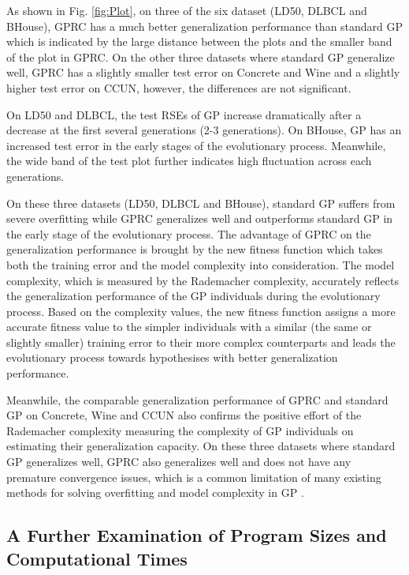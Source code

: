 \documentclass[conference]{IEEEtran}
\begin{document}
As shown in Fig. \ref{fig:Plot}, on three of the six dataset (LD50, DLBCL and BHouse), GPRC has a much better generalization performance than standard GP which is indicated by the large distance between the plots and the smaller band of the plot in GPRC. On the other three datasets where standard GP generalize well, GPRC has a slightly smaller test error on Concrete and Wine and a slightly higher test error on CCUN, however, the differences are not significant.

On LD50 and DLBCL, the test RSEs of GP increase dramatically after a decrease at the first several generations (2-3 generations). On BHouse, GP has an increased test error in the early stages of the evolutionary process. Meanwhile, the wide band of the test plot further indicates high fluctuation across each generations. 

On these three datasets (LD50, DLBCL and BHouse), standard GP suffers from severe overfitting while GPRC generalizes well and outperforms standard GP in the early stage of the evolutionary process. The advantage of GPRC on the generalization performance is brought by the new fitness function which takes both the training error and the model complexity into consideration. The model complexity, which is measured by the Rademacher complexity, accurately reflects the generalization performance of the GP individuals during the evolutionary process. Based on the complexity values, the new fitness function assigns a more accurate fitness value to the simpler individuals with a similar (the same or slightly smaller) training error to their more complex counterparts and leads the evolutionary process towards hypothesises with better generalization performance. 

Meanwhile, the comparable generalization performance of GPRC and standard GP on Concrete, Wine and CCUN also confirms the positive effort of the Rademacher complexity measuring the complexity of GP individuals on estimating their generalization capacity. On these three datasets where standard GP generalizes well, GPRC also generalizes well and does not have any premature convergence issues, which is a common limitation of many existing methods for solving overfitting and model complexity in GP \cite{b20}.

\subsection{A Further Examination of Program Sizes and Computational Times}
\end{document}
